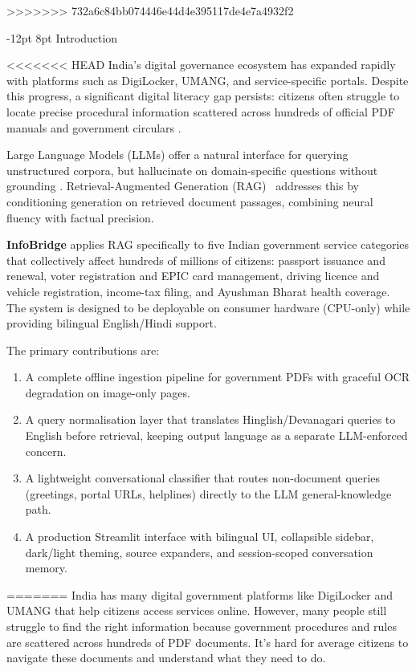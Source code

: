 \documentclass[10pt,twocolumn]{article}
\makeatletter
\renewcommand{\section}{\@startsection{section}{1}{\z@}%
  {-12pt \@plus -2pt \@minus -1pt}%
  {8pt \@plus 0.3pt}%
  {\normalfont\Large\bfseries}}
\newcommand{\tightlist}{\setlength{\itemsep}{1pt}\setlength{\topsep}{2pt}\setlength{\parsep}{0pt}}
\makeatother
\begin{document}
>>>>>>> 732a6c84bb074446e44d4e395117de4e7a4932f2
\bigskip

\section{Introduction}

<<<<<<< HEAD
India's digital governance ecosystem has expanded rapidly with platforms such as
DigiLocker, UMANG, and service-specific portals.  Despite this progress, a significant
digital literacy gap persists: citizens often struggle to locate precise procedural
information scattered across hundreds of official PDF manuals and government circulars
\cite{india_digital_gov}.

Large Language Models (LLMs) offer a natural interface for querying unstructured
corpora, but hallucinate on domain-specific questions without grounding
\cite{lewis2020rag}.  Retrieval-Augmented Generation (RAG)~\cite{lewis2020rag}
addresses this by conditioning generation on retrieved document passages, combining
neural fluency with factual precision.

\textbf{InfoBridge} applies RAG specifically to five Indian government service
categories that collectively affect hundreds of millions of citizens: passport
issuance and renewal, voter registration and EPIC card management, driving licence
and vehicle registration, income-tax filing, and Ayushman Bharat health coverage.
The system is designed to be deployable on consumer hardware (CPU-only) while
providing bilingual English/Hindi support.

\medskip\noindent The primary contributions are:
\begin{enumerate}
  \tightlist
  \item A complete offline ingestion pipeline for government PDFs with graceful OCR
    degradation on image-only pages.
  \item A query normalisation layer that translates Hinglish/Devanagari queries to
    English before retrieval, keeping output language as a separate LLM-enforced concern.
  \item A lightweight conversational classifier that routes non-document queries
    (greetings, portal URLs, helplines) directly to the LLM general-knowledge path.
  \item A production Streamlit interface with bilingual UI, collapsible sidebar,
    dark/light theming, source expanders, and session-scoped conversation memory.
\end{enumerate}
=======
India has many digital government platforms like DigiLocker and UMANG that help citizens access services online. However, many people still struggle to find the right information because government procedures and rules are scattered across hundreds of PDF documents. It's hard for average citizens to navigate these documents and understand what they need to do.
\end{document}
